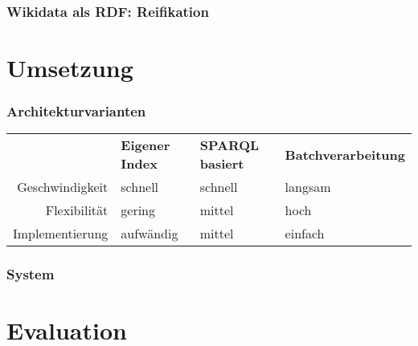 \documentclass[aspectratio=1609,xcolor=usenames,dvipsnames,svgnames]{beamer}
\begin{document}
\begin{frame}[t, fragile]\frametitle{Wikidata als RDF: Reifikation}
  \vspace{0.25cm}
  
\end{frame}


\section{Umsetzung}

\begin{frame}\frametitle{Architekturvarianten}
  \begin{center}
    {\renewcommand{\arraystretch}{1.3}
    \begin{tabular}{r | p{0.20\framewidth}p{0.20\framewidth}p{0.35\framewidth}}
       & {\bfseries Eigener Index} & {\bfseries SPARQL basiert} & {\bfseries Batchverarbeitung} \\
      Geschwindigkeit & schnell & schnell & langsam \\
      Flexibilität & gering & mittel & hoch \\
      Implementierung & aufwändig & mittel & einfach \\
    \end{tabular}
    }
  \end{center}
\end{frame}

\begin{frame}\frametitle{System}
  \begin{figure}
    
  \end{figure}
\end{frame}

\section{Evaluation}
\end{document}
